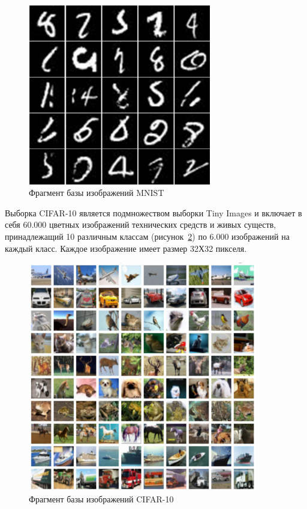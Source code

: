 \begin{figure}[h]
	\begin{center}
		\includegraphics[width=8cm]{man-source/images/ch3/pic3-12.pdf}
		\caption{Фрагмент базы изображений MNIST}		
		\label{fig:mnist_example}
	\end{center}
\end{figure}

Выборка CIFAR-10 \cite{krizhevsky2009learning} является подмножеством выборки Tiny Images \cite{torralba2008} и включает в себя 60.000 цветных изображений технических средств и живых существ, принадлежащий 10 различным классам (рисунок~\ref{fig:cifar_dataset}) по 6.000 изображений на каждый класс. Каждое изображение имеет размер 32Х32 пикселя.

\begin{figure}[h!]
	\begin{center}
		\includegraphics[width=10cm]{man-source/images/ch3/pic3-2.pdf}
		\caption{Фрагмент базы изображений CIFAR-10}				
		\label{fig:cifar_dataset}
	\end{center}
\end{figure}

